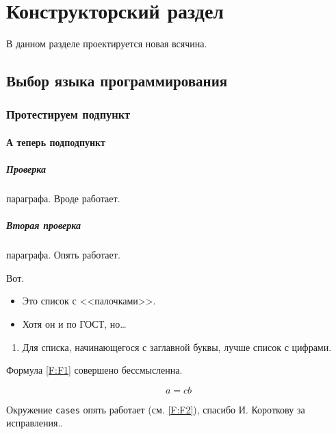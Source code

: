\chapter{Конструкторский раздел}
\label{cha:design}

В данном разделе проектируется новая всячина.

\section{Выбор языка программирования}

\subsection{Протестируем подпункт}
\subsubsection{А теперь подподпункт}


\paragraph{Проверка} параграфа. Вроде работает.
\paragraph{Вторая проверка} параграфа. Опять работает.

Вот.

\begin{itemize}
    \item Это список с <<палочками>>.
    \item Хотя он и по ГОСТ, но\dots
\end{itemize}

\begin{enumerate}
    \item  Для списка, начинающегося с заглавной буквы, лучше список с цифрами.
\end{enumerate}

Формула \ref{F:F1} совершено бессмысленна.


\begin{equation}
    a= cb
    \label{F:F1}
\end{equation}


Окружение \texttt{cases} опять работает (см. \ref{F:F2}), спасибо И. Короткову за исправления..


